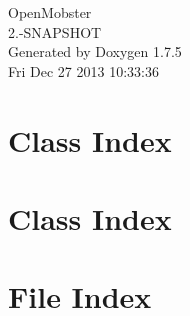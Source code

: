 \documentclass[a4paper]{book}
\begin{document}
\hypersetup{pageanchor=false,citecolor=blue}
\begin{titlepage}
\vspace*{7cm}
\begin{center}
{\Large \-Open\-Mobster \\[1ex]\large 2.-\/\-S\-N\-A\-P\-S\-H\-O\-T }\\
\vspace*{1cm}
{\large \-Generated by Doxygen 1.7.5}\\
\vspace*{0.5cm}
{\small Fri Dec 27 2013 10:33:36}\\
\end{center}
\end{titlepage}
\clearemptydoublepage
{}
\tableofcontents
\clearemptydoublepage
{}
\hypersetup{pageanchor=true,citecolor=blue}
\chapter{\-Class \-Index}

\chapter{\-Class \-Index}

\chapter{\-File \-Index}

\end{document}
